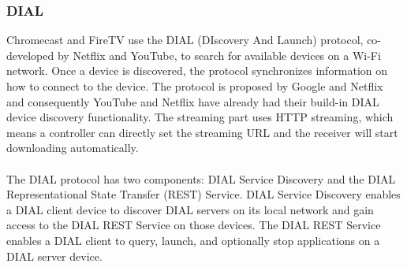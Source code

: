 \subsubsection{DIAL} 
Chromecast and FireTV use the DIAL \cite{dial} (DIscovery And Launch) protocol,
co-developed by Netflix and YouTube, to search for available devices on a Wi-Fi network. 
Once a device is discovered, the protocol synchronizes information on how to 
connect to the device. The protocol is proposed by Google and Netflix and consequently 
YouTube and Netflix  have already had their build-in DIAL device discovery functionality. The 
streaming part uses HTTP streaming, which means a controller can directly set the 
streaming URL and the receiver will start downloading automatically. \\
\\
The DIAL protocol has two components: DIAL Service Discovery and the DIAL 
Representational State Transfer (REST) Service. DIAL Service Discovery enables a 
DIAL client device to discover DIAL servers on its local network and gain access to the DIAL REST Service on those devices. The DIAL REST Service enables a DIAL client to query, launch, and optionally stop applications on a DIAL server device. 

